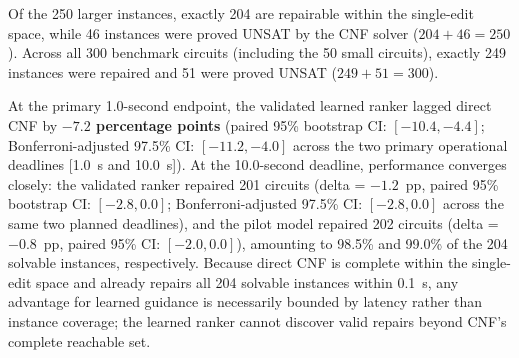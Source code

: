 \documentclass[11pt,a4paper]{article}
\begin{document}
Of the 250 larger instances, exactly 204 are repairable within the single-edit space, while 46 instances were proved UNSAT by the CNF solver ($204 + 46 = 250$). Across all 300 benchmark circuits (including the 50 small circuits), exactly 249 instances were repaired and 51 were proved UNSAT ($249 + 51 = 300$).

At the primary 1.0-second endpoint, the validated learned ranker lagged direct CNF by \textbf{$-7.2$ percentage points} (paired 95\% bootstrap CI: $[-10.4, -4.4]$; Bonferroni-adjusted 97.5\% CI: $[-11.2, -4.0]$ across the two primary operational deadlines [1.0~s and 10.0~s]). At the 10.0-second deadline, performance converges closely: the validated ranker repaired 201 circuits (delta = $-1.2$~pp, paired 95\% bootstrap CI: $[-2.8, 0.0]$; Bonferroni-adjusted 97.5\% CI: $[-2.8, 0.0]$ across the same two planned deadlines), and the pilot model repaired 202 circuits (delta = $-0.8$~pp, paired 95\% CI: $[-2.0, 0.0]$), amounting to 98.5\% and 99.0\% of the 204 solvable instances, respectively. Because direct CNF is complete within the single-edit space and already repairs all 204 solvable instances within 0.1~s, any advantage for learned guidance is necessarily bounded by latency rather than instance coverage; the learned ranker cannot discover valid repairs beyond CNF's complete reachable set.
\end{document}
